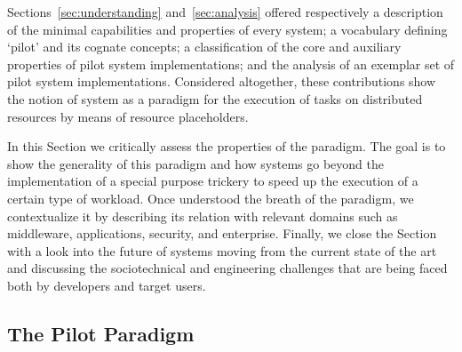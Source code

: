\documentclass{sig-alternate}
\begin{document}

Sections~\ref{sec:understanding} and~\ref{sec:analysis} offered respectively a
description of the minimal capabilities and properties of every \pilot system;
a vocabulary defining `pilot' and its cognate concepts; a classification of the
core and auxiliary properties of pilot system implementations; and the analysis
of an exemplar set of pilot system implementations. Considered altogether,
these contributions show the notion of \pilot system as a paradigm for the
execution of tasks on distributed resources by means of resource placeholders.

In this Section we critically assess the properties of the \pilot paradigm. The
goal is to show the generality of this paradigm and how \pilot systems go
beyond the implementation of a special purpose trickery to speed up the
execution of a certain type of workload. Once understood the breath of the
\pilot paradigm, we contextualize it by describing its relation with relevant
domains such as middleware, applications, security, and enterprise. Finally, we
close the Section with a look into the future of \pilot systems moving from the
current state of the art and discussing the sociotechnical and engineering
challenges that are being faced both by developers and target users.


%
\subsection{The Pilot Paradigm}
\label{sec:5.1}

\end{document}
